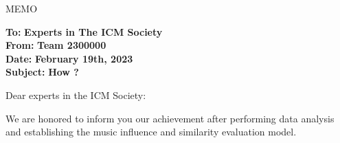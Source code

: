 \documentclass[12pt]{article}  %
\begin{document}
\begin{letter}{MEMO\centering}
	\begin{flushleft}  %
		\textbf{To:} \textbf{Experts in The ICM Society}\\
		\textbf{From:} \textbf{Team 2300000}\\
		\textbf{Date:} \textbf{February 19th, 2023}\\
		\textbf{Subject:} \textbf{How ?}
	\end{flushleft}

\noindent Dear experts in the ICM Society:

 We are honored to inform you our achievement after  performing data analysis and establishing the music influence and similarity evaluation model. 

\end{letter}



	








\end{document}
